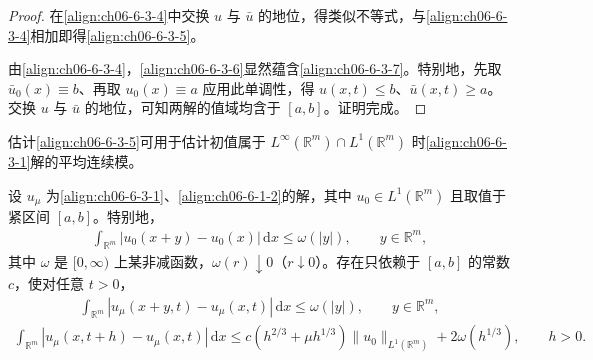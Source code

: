 \documentclass[../../main.tex]{subfiles}
\begin{document}
\begin{proof}
在\eqref{align:ch06-6-3-4}中交换 $u$ 与 $\bar{u}$ 的地位，得类似不等式，与\eqref{align:ch06-6-3-4}相加即得\eqref{align:ch06-6-3-5}。

由\eqref{align:ch06-6-3-4}，\eqref{align:ch06-6-3-6}显然蕴含\eqref{align:ch06-6-3-7}。特别地，先取 $\bar{u}_{0}(x)\equiv b$、再取 $u_{0}(x)\equiv a$ 应用此单调性，得 $u(x,t)\leqslant b$、$\bar{u}(x,t)\geqslant a$。交换 $u$ 与 $\bar{u}$ 的地位，可知两解的值域均含于 $[a,b]$。证明完成。
\end{proof}

估计\eqref{align:ch06-6-3-5}可用于估计初值属于 $L^{\infty}(\mathbb{R}^{m})\cap L^{1}(\mathbb{R}^{m})$ 时\eqref{align:ch06-6-3-1}解的平均连续模。

\begin{lemma}\label{lemma:ch06-6-3-3}
设 $u_{\mu}$ 为\eqref{align:ch06-6-3-1}、\eqref{align:ch06-6-1-2}的解，其中 $u_{0}\in L^{1}(\mathbb{R}^{m})$ 且取值于紧区间 $[a,b]$。特别地，
\begin{align}
\int_{\mathbb{R}^{m}}|u_{0}(x+y)-u_{0}(x)|\,\mathrm{d}x\leqslant\omega(|y|),\qquad y\in\mathbb{R}^{m},
\label{align:ch06-6-3-12}
\end{align}
其中 $\omega$ 是 $[0,\infty)$ 上某非减函数，$\omega(r)\downarrow 0$（$r\downarrow 0$）。存在只依赖于 $[a,b]$ 的常数 $c$，使对任意 $t>0$，
\begin{align}
\int_{\mathbb{R}^{m}}|u_{\mu}(x+y,t)-u_{\mu}(x,t)|\,\mathrm{d}x\leqslant\omega(|y|),\qquad y\in\mathbb{R}^{m},
\label{align:ch06-6-3-13}
\end{align}
\begin{align}
\int_{\mathbb{R}^{m}}|u_{\mu}(x,t+h)-u_{\mu}(x,t)|\,\mathrm{d}x\leqslant c(h^{2/3}+\mu h^{1/3})\|u_{0}\|_{L^{1}(\mathbb{R}^{m})}+2\omega(h^{1/3}),\qquad h>0.
\label{align:ch06-6-3-14}
\end{align}
\end{lemma}
\end{document}
